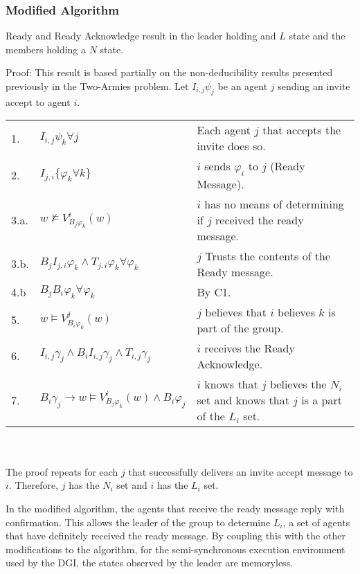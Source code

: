 \subsubsection{Modified Algorithm}

\begin{thm}
Ready and Ready Acknowledge result in the leader holding and $L$ state and the members holding a $N$ state.
\end{thm}

Proof: This result is based partially on the non-deducibility results presented previously in the Two-Armies problem. Let $I_{i,j} \psi_j$ be an agent $j$ sending an invite accept to agent $i$.

\begin{table}[h!]
\centering
\small
\begin{tabularx}{\linewidth}{l X X}
1. & $I_{i,j} \psi_k \forall j $ & Each agent $j$ that accepts the invite does so.  \\
2. & $I_{j,i} \{ \varphi_k \forall k \}$ & $i$ sends $\varphi_i$ to $j$ (Ready Message). \\
3.a. & $w \not \vDash V_{B_j \varphi_k}^i(w) $ & $i$ has no means of determining if $j$ received the ready message. \\
3.b. & $B_{j}I_{j,i} \varphi_k \wedge T_{j,i} \varphi_k \forall \varphi_k$ & $j$ Trusts the contents of the Ready message. \\
4.b & $B_j B_i \varphi_k \forall \varphi_k$ & By C1. \\
5. & $w \vDash V_{B_i \varphi_k}^j(w)$ & $j$ believes that $i$ believes $k$ is part of the group. \\
6. & $I_{i,j} \gamma_j \wedge B_i I_{i,j} \gamma_j \wedge T_{i,j} \gamma_j$ & $i$ receives the Ready Acknowledge. \\
7. & $B_i \gamma_j \rightarrow w \vDash V_{B_j \varphi_k}^{i}(w) \wedge B_i \varphi_j$ & $i$ knows that $j$ believes the $N_i$ set and knows that $j$ is a part of the $L_i$ set. \\
\end{tabularx} \\~\\
The proof repeats for each $j$ that successfully delivers an invite accept message to $i$. Therefore, $j$ has the $N_i$ set and $i$ has the $L_i$ set.
\label{tab:readylnsetproof}
\end{table}

In the modified algorithm, the agents that receive the ready message reply with confirmation. This allows the leader of the group to determine $L_i$, a set of agents that have definitely received the ready message. By coupling this with the other modifications to the algorithm, for the semi-synchronous execution environment used by the \ac{DGI}, the states observed by the leader are memoryless.

